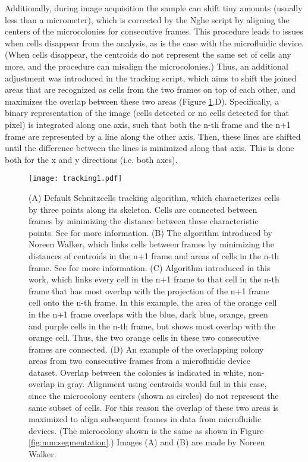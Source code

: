 Additionally, during image acquisition the sample can shift tiny amounts (usually less than a micrometer), which is corrected by the Nghe script by aligning the centers of the microcolonies for consecutive frames.
This procedure leads to issues when cells disappear from the analysis, as is the case with the microfluidic device.
(When cells disappear, the centroids do not represent the same set of cells any more, and the procedure can misalign the microcolonies.)
Thus, an additional adjustment was introduced in the tracking script, which aims to shift the joined areas that are recognized as cells from the two frames on top of each other, and maximizes the overlap between these two areas (Figure \ref{fig:mm:tracking}.D).
Specifically, a binary representation of the image (cells detected or no cells detected for that pixel) is integrated along one axis, such that both the n-th frame and the n+1 frame are represented by a line along the other axis. Then, these lines are shifted until the difference between the lines is minimized along that axis. This is done both for the x and y directions (i.e. both axes).

\begin{figure}
	\centering
	\texttt{[image: tracking1.pdf]}
	\caption{ 
		(A) Default Schnitzcells tracking algorithm, which characterizes cells by three points along its skeleton. Cells are connected between frames by minimizing the distance between these characteristic points. See \cite{Walker2016t} for more information.
		(B) The algorithm introduced by Noreen Walker, which links cells between frames by minimizing the distances of centroids in the n+1 frame and areas of cells in the n-th frame.
		See \cite{Walker2016t} for more information.
		(C) Algorithm introduced in this work, which links every cell in the n+1 frame to that cell in the n-th frame that has most overlap with the projection of the n+1 frame cell onto the n-th frame.
		In this example, the area of the orange cell in the n+1 frame overlaps with the blue, dark blue, orange, green and purple cells in the n-th frame, but shows most overlap with the orange cell. Thus, the two orange cells in these two consecutive frames are connected.
		(D) An example of the overlapping colony areas from two consecutive frames from a microfluidic device dataset. Overlap between the colonies is indicated in white, non-overlap in gray. Alignment using centroids would fail in this case, since the microcolony centers (shown as circles) do not represent the same subset of cells. For this reason the overlap of these two areas is maximized to align subsequent frames in data from microfluidic devices. (The microcolony shown is the same as shown in Figure \ref{fig:mm:segmentation}.)
		Images (A) and (B) are made by Noreen Walker.
	}
	\label{fig:mm:tracking}
\end{figure}

